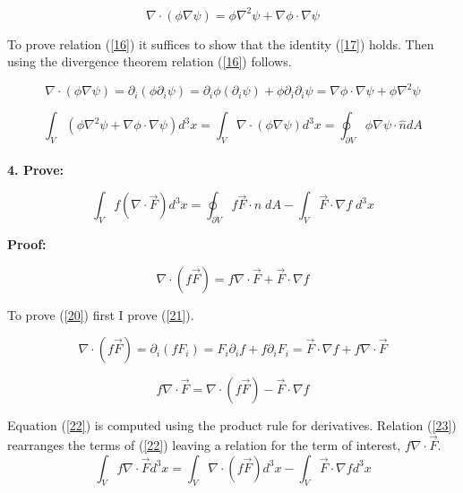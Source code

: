 \documentclass[oneside]{book}
\begin{document}
\begin{equation}
\label{17}   \nabla \cdot (\phi \nabla \psi) =\phi \nabla^2 \psi + \nabla \phi \cdot \nabla \psi
\end{equation}

To prove relation (\ref{16}) it suffices to show that the identity (\ref{17}) holds. Then using the divergence theorem relation (\ref{16}) follows.


\begin{equation}
\label{18}   \nabla \cdot (\phi \nabla \psi) = \partial_i (\phi \partial_i \psi) = \partial_i \phi (\partial_i \psi) +  \phi \partial_i \partial_i \psi = \nabla \phi \cdot \nabla \psi+  \phi \nabla^2 \psi 
\end{equation}


\begin{equation}
\label{19} \int_V (\phi \nabla^2 \psi + \nabla \phi \cdot \nabla \psi ) d^3 x = \int_V \nabla \cdot (\phi \nabla \psi)  d^3 x = \oint_{\partial V} \phi \nabla \psi \cdot \hat{n} dA 
\end{equation}\\

\textbf{4. Prove:}


\begin{equation}
\label{20} \int_V f (\nabla \cdot \vec{F}) d^3 x = \oint_{\partial V} f \vec{F}  \cdot \hat{n}\; dA - \int_V \vec{F} \cdot \nabla f\; d^3 x 
\end{equation}


\textbf{Proof:}


\begin{equation}
\label{21}   \nabla \cdot (f \vec{F}) =  f \nabla \cdot \vec{F} + \vec{F} \cdot \nabla f
\end{equation}

To prove (\ref{20}) first I prove (\ref{21}).

\begin{equation}
\label{22}   \nabla \cdot (f \vec{F}) =  \partial_i (f F_i) = F_i \partial_i f + f \partial_i F_i = \vec{F} \cdot \nabla f + f \nabla \cdot \vec{F}
\end{equation}


\begin{equation}
\label{23}  f \nabla \cdot \vec{F} = \nabla \cdot (f \vec{F}) -\vec{F} \cdot \nabla f 
\end{equation}

Equation (\ref{22}) is computed using the product rule for derivatives. Relation (\ref{23}) rearranges the terms of (\ref{22}) leaving a relation for the term of interest, $ f \nabla \cdot \vec{F}$.
\begin{equation}
\label{24} \int_V f \nabla \cdot \vec{F} d^3 x =\int_V \nabla \cdot (f \vec{F})d^3 x  - \int_V \vec{F} \cdot \nabla f d^3 x 
\end{equation}
\end{document}
